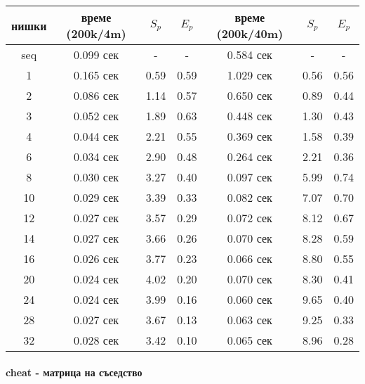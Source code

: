 \begin{center}
\begin{tabular}{ c | c c c | c c c | }
  нишки & време (200k/4m) & $S_p$ & $E_p$ & време (200k/40m) & $S_p$ & $E_p$ \\
  \hline
  seq & 0.099 сек & - & - & 0.584 сек & - & - \\
  1  & 0.165 сек & 0.59 & 0.59 & 1.029 сек & 0.56 & 0.56 \\
  2  & 0.086 сек & 1.14 & 0.57 & 0.650 сек & 0.89 & 0.44 \\
  3  & 0.052 сек & 1.89 & 0.63 & 0.448 сек & 1.30 & 0.43 \\
  4  & 0.044 сек & 2.21 & 0.55 & 0.369 сек & 1.58 & 0.39 \\
  6  & 0.034 сек & 2.90 & 0.48 & 0.264 сек & 2.21 & 0.36 \\
  8  & 0.030 сек & 3.27 & 0.40 & 0.097 сек & 5.99 & 0.74 \\
  10 & 0.029 сек & 3.39 & 0.33 & 0.082 сек & 7.07 & 0.70 \\
  12 & 0.027 сек & 3.57 & 0.29 & 0.072 сек & 8.12 & 0.67 \\
  14 & 0.027 сек & 3.66 & 0.26 & 0.070 сек & 8.28 & 0.59 \\
  16 & 0.026 сек & 3.77 & 0.23 & 0.066 сек & 8.80 & 0.55 \\
  20 & 0.024 сек & 4.02 & 0.20 & 0.070 сек & 8.30 & 0.41 \\
  24 & 0.024 сек & 3.99 & 0.16 & 0.060 сек & 9.65 & 0.40 \\
  28 & 0.027 сек & 3.67 & 0.13 & 0.063 сек & 9.25 & 0.33 \\
  32 & 0.028 сек & 3.42 & 0.10 & 0.065 сек & 8.96 & 0.28 \\
\end{tabular}
\end{center}

\paragraph*{cheat - матрица на съседство}

